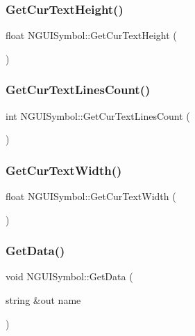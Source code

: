 \subsubsection{\texorpdfstring{Get\+Cur\+Text\+Height()}{GetCurTextHeight()}}
{\footnotesize\ttfamily float N\+G\+U\+I\+Symbol\+::\+Get\+Cur\+Text\+Height (\begin{DoxyParamCaption}{ }\end{DoxyParamCaption})}

\hypertarget{class_n_g_u_i_symbol_ade52abb51f8dd73a8a7d52d321dddf11}{}\label{class_n_g_u_i_symbol_ade52abb51f8dd73a8a7d52d321dddf11} 
\subsubsection{\texorpdfstring{Get\+Cur\+Text\+Lines\+Count()}{GetCurTextLinesCount()}}
{\footnotesize\ttfamily int N\+G\+U\+I\+Symbol\+::\+Get\+Cur\+Text\+Lines\+Count (\begin{DoxyParamCaption}{ }\end{DoxyParamCaption})}

\hypertarget{class_n_g_u_i_symbol_adbf3d31377b8157cfc3756aadf714871}{}\label{class_n_g_u_i_symbol_adbf3d31377b8157cfc3756aadf714871} 
\subsubsection{\texorpdfstring{Get\+Cur\+Text\+Width()}{GetCurTextWidth()}}
{\footnotesize\ttfamily float N\+G\+U\+I\+Symbol\+::\+Get\+Cur\+Text\+Width (\begin{DoxyParamCaption}{ }\end{DoxyParamCaption})}

\hypertarget{class_n_g_u_i_symbol_a5ab45d0f7c60e2fed84425c257234efe}{}\label{class_n_g_u_i_symbol_a5ab45d0f7c60e2fed84425c257234efe} 
\subsubsection{\texorpdfstring{Get\+Data()}{GetData()}}
{\footnotesize\ttfamily void N\+G\+U\+I\+Symbol\+::\+Get\+Data (\begin{DoxyParamCaption}\item[{string \&out}]{name }\end{DoxyParamCaption})}

